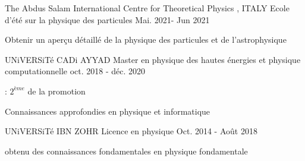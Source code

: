 

\begin{cventries}
	\cventry
	{The Abdus Salam International Centre for Theoretical Physics , ITALY} %
	{Ecole d'été sur la physique des particules} %
	{} %
	{Mai. 2021- Jun 2021} %
	{\begin{cvitems}
			\item Obtenir un aperçu détaillé de la physique des particules et de l'astrophysique 
		\end{cvitems}
	}
	\cventry
	{UNiVERSiTé CADi AYYAD
	} %
	{Master en physique des hautes énergies et physique computationnelle
	} %
	{} %
	{oct. 2018 - déc. 2020} %
	{
		\begin{cvitems} %
			\item {:  $2^{ème}$ de la promotion}
			\item {Connaissances approfondies en physique et informatique}
		\end{cvitems}
	}
	\cventry
	{UNiVERSiTé IBN ZOHR} %
	{Licence en physique} %
	{} %
	{Oct. 2014 - Août 2018} %
	{
		\begin{cvitems} %
			\item {obtenu des connaissances fondamentales en physique fondamentale}
		\end{cvitems}
	}
\end{cventries}

